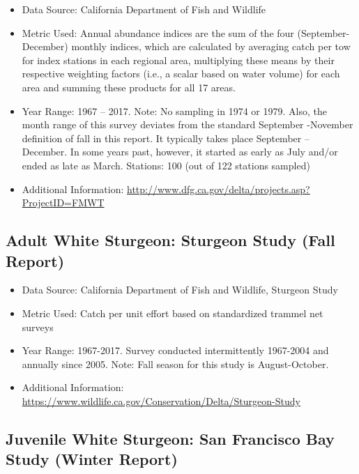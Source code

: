 \documentclass[
]{book}
\providecommand{\tightlist}{%
  \setlength{\itemsep}{0pt}\setlength{\parskip}{0pt}}
\begin{document}
\begin{itemize}
\tightlist
\item
  Data Source: California Department of Fish and Wildlife
\item
  Metric Used: Annual abundance indices are the sum of the four (September-December) monthly indices, which are calculated by averaging catch per tow for index stations in each regional area, multiplying these means by their respective weighting factors (i.e., a scalar based on water volume) for each area and summing these products for all 17 areas.
\item
  Year Range: 1967 -- 2017. Note: No sampling in 1974 or 1979. Also, the month range of this survey deviates from the standard September -November definition of fall in this report. It typically takes place September -- December. In some years past, however, it started as early as July and/or ended as late as March.
  Stations: 100 (out of 122 stations sampled)
\item
  Additional Information: \url{http://www.dfg.ca.gov/delta/projects.asp?ProjectID=FMWT}
\end{itemize}

\hypertarget{adult-white-sturgeon-sturgeon-study-fall-report}{%
\subsection{Adult White Sturgeon: Sturgeon Study (Fall Report)}\label{adult-white-sturgeon-sturgeon-study-fall-report}}

\begin{itemize}
\tightlist
\item
  Data Source: California Department of Fish and Wildlife, Sturgeon Study\\
\item
  Metric Used: Catch per unit effort based on standardized trammel net surveys
\item
  Year Range: 1967-2017. Survey conducted intermittently 1967-2004 and annually since 2005. Note: Fall season for this study is August-October.
\item
  Additional Information: \url{https://www.wildlife.ca.gov/Conservation/Delta/Sturgeon-Study}
\end{itemize}

\hypertarget{juvenile-white-sturgeon-san-francisco-bay-study-winter-report}{%
\subsection{Juvenile White Sturgeon: San Francisco Bay Study (Winter Report)}\label{juvenile-white-sturgeon-san-francisco-bay-study-winter-report}}
\end{document}
